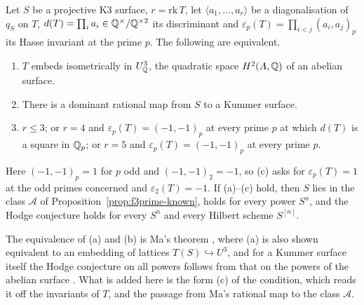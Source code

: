 \begin{proposition}\label{prop:kummerq}
Let $S$ be a projective K3 surface, $r=\mathrm{rk}\,T$, let $\langle a_{1},\dots,a_{r}\rangle$ be a diagonalisation of $q_{S}$ on $T$, $d(T)=\prod_{i}a_{i}\in\mathbb{Q}^{\times}/\mathbb{Q}^{\times2}$ its discriminant and $\varepsilon_{p}(T)=\prod_{i<j}(a_{i},a_{j})_{p}$ its Hasse invariant at the prime $p$. The following are equivalent.
\begin{enumerate}[label=\textup{(\alph*)},leftmargin=2.4em,itemsep=2pt]
\item $T$ embeds isometrically in $U_{\mathbb{Q}}^{3}$, the quadratic space $H^{2}(A,\mathbb{Q})$ of an abelian surface.
\item There is a dominant rational map from $S$ to a Kummer surface.
\item $r\le3$; or $r=4$ and $\varepsilon_{p}(T)=(-1,-1)_{p}$ at every prime $p$ at which $d(T)$ is a square in $\mathbb{Q}_{p}$; or $r=5$ and $\varepsilon_{p}(T)=(-1,-1)_{p}$ at every prime $p$.
\end{enumerate}
Here $(-1,-1)_{p}=1$ for $p$ odd and $(-1,-1)_{2}=-1$, so (c) asks for $\varepsilon_{p}(T)=1$ at the odd primes concerned and $\varepsilon_{2}(T)=-1$. If (a)--(c) hold, then $S$ lies in the class $\mathcal{A}$ of Proposition~\ref{prop:f3prime-known}, \Fiii{} holds for every power $S^{n}$, and the Hodge conjecture holds for every $S^{n}$ and every Hilbert scheme $S^{[n]}$.
\end{proposition}

The equivalence of (a) and (b) is Ma's theorem \cite[Prop.~3.2]{Ma12}, where (a) is also shown equivalent to an embedding of lattices $T(S)\hookrightarrow U^{3}$, and for a Kummer surface itself the Hodge conjecture on all powers follows from that on the powers of the abelian surface \cite[\S0.2]{Var25}. What is added here is the form (c) of the condition, which reads it off the invariants of $T$, and the passage from Ma's rational map to the class $\mathcal{A}$.

